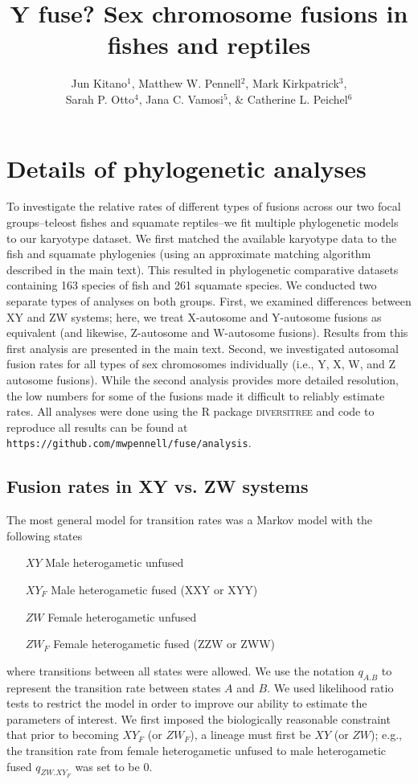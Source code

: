 \documentclass[12pt,twoside]{article}
\title{Y fuse? Sex chromosome fusions in fishes and reptiles}
\author{Jun Kitano$^1$, Matthew W. Pennell$^2$, Mark Kirkpatrick$^3$,\\ Sarah P. Otto$^4$, Jana C. Vamosi$^5$, \& Catherine L. Peichel$^6$}
\date{}
\begin{document}
\maketitle

\section{Details of phylogenetic analyses}

To investigate the relative rates of different types of fusions across our two focal groups--teleost fishes and squamate reptiles--we fit multiple phylogenetic models to our karyotype dataset. We first matched the available karyotype data to the fish \citep{Rabosky2013} and squamate \citep{squamatetree, PyronBurbrink2014} phylogenies (using an approximate matching algorithm described in the main text). This resulted in phylogenetic comparative datasets containing 163 species of fish and 261 squamate species.  We conducted two separate types of analyses on both groups. First, we examined differences between XY and ZW systems; here, we treat X-autosome and Y-autosome fusions as equivalent (and likewise, Z-autosome and W-autosome fusions). Results from this first analysis are presented in the main text. Second, we investigated autosomal fusion rates for all types of sex chromosomes individually (i.e., Y, X, W, and Z autosome fusions). While the second analysis provides more detailed resolution, the low numbers for some of the fusions made it difficult to reliably estimate rates. All analyses were done using the R package \textsc{diversitree} \citep{FitzJohn2012} and code to reproduce all results can be found at \texttt{https://github.com/mwpennell/fuse/analysis}. 

\subsection{Fusion rates in XY vs. ZW systems}

The most general model for transition rates was a Markov model \citep{Pagel1994} with the following states
\begin{itemize}
\item[$XY$] Male heterogametic unfused
\item[$XY_F$] Male heterogametic fused (XXY or XYY)
\item[$ZW$] Female heterogametic unfused
\item[$ZW_F$] Female heterogametic fused (ZZW or ZWW)
\end{itemize}
where transitions between all states were allowed. We use the notation $q_{A.B}$ to represent the transition rate between states $A$ and $B$. We used likelihood ratio tests to restrict the model in order to improve our ability to estimate the parameters of interest. We first imposed the biologically reasonable constraint that prior to becoming $XY_F$ (or $ZW_F$), a lineage must first be $XY$ (or $ZW$); e.g., the transition rate from female heterogametic unfused to male heterogametic fused $q_{ZW.XY_F}$ was set to be 0. 
\end{document}
